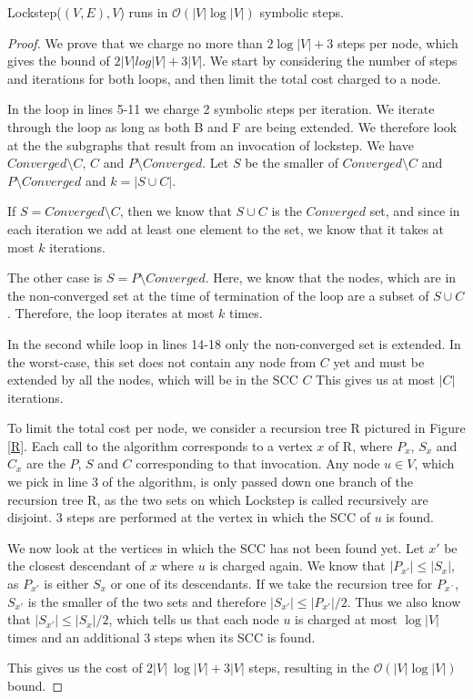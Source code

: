 \documentclass[../master/master.tex]{subfiles}
\begin{document}
\begin{theorem}\label{lockstep} Lockstep($(V, E), V$) runs in $\mathcal{O}(|V|\log |V|)$ symbolic steps.
\end{theorem}
\begin{proof}
  We prove that we charge no more than $2 \log |V|+3$ steps per node, which gives the bound of $2|V|log|V|+3|V|$. We start by considering the number of steps and iterations for both loops, and then limit the total cost charged to a node.

  In the loop in lines 5-11 we charge 2 symbolic steps per iteration. We iterate through the loop as long as both B and F are being extended. We therefore look at the the subgraphs that result from an invocation of lockstep. We have $Converged\setminus C$, $C$ and $P\setminus Converged$. Let $S$ be the smaller of $Converged\setminus C$ and $P\setminus Converged$ and $k = |S\cup C|$.

  If $S = Converged\setminus C$, then we know that $S\cup C$ is the $Converged$ set, and since in each iteration we add at least one element to the set, we know that it takes at most $k$ iterations.

  The other case is $S=P\setminus Converged$. Here, we know that the nodes, which are in the non-converged set at the time of termination of the loop are a subset of $S\cup C$. Therefore, the loop iterates at most $k$ times.

  In the second while loop in lines 14-18 only the non-converged set is extended. In the worst-case, this set does not contain any node from $C$ yet and must be extended by all the nodes, which will be in the SCC $C$ This gives us at most $|C|$ iterations.

  To limit the total cost per node, we consider a recursion tree R pictured in Figure \ref{R}. Each call to the algorithm corresponds to a vertex $x$ of R, where $P_x$, $S_x$ and $C_x$ are the $P$, $S$ and $C$ corresponding to that invocation. Any node $u \in V$, which we pick in line 3 of the algorithm, is only passed down one branch of the recursion tree R, as the two sets on which Lockstep is called recursively are disjoint. 3 steps are performed at the vertex in which the SCC of $u$ is found.

  We now look at the vertices in which the SCC has not been found yet. Let $x'$ be the closest descendant of $x$ where $u$ is charged again. We know that $|P_{x'}|\leq |S_x|$, as $P_{x'}$ is either $S_x$ or one of its descendants. If we take the recursion tree for $P_{x´}$, $S_{x'}$ is the smaller of the two sets and therefore $|S_{x'}|\leq |P_{x'}|/2$. Thus we also know that $|S_{x'}|\leq |S_{x}|/2$, which tells us that each node $u$ is charged at most $\log |V|$ times and an additional 3 steps when its SCC is found.

  This gives us the cost of $2|V|\ \log |V| + 3|V|$ steps, resulting in the $\mathcal{O}(|V|\log |V|)$ bound.
\end{proof}
\end{document}
